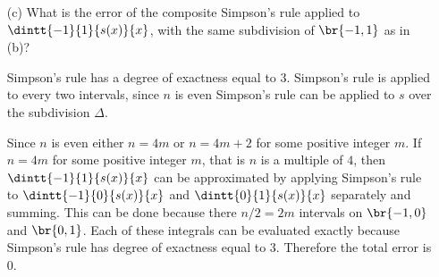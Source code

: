 \documentclass[11pt]{article}
\begin{document}
\begin{enumerate}
\begin{enumerate}
            \item[(c)] %
                What is the error of the composite Simpson's rule applied to
                $\dintt{-1}{1}{s(x)}{x}$, with the same subdivision of
                $\br{-1, 1}$ as in (b)?

                Simpson's rule has a degree of exactness equal to 3.
                Simpson's rule is applied to every two intervals, since $n$ is
                even Simpson's rule can be applied to $s$ over the subdivision
                $\Delta$.

                Since $n$ is even either $n = 4m$ or $n = 4m + 2$ for some positive
                integer $m$.
                If $n = 4m$ for some positive integer $m$, that is $n$ is a multiple
                of $4$, then $\dintt{-1}{1}{s(x)}{x}$ can be approximated by
                applying Simpson's rule to $\dintt{-1}{0}{s(x)}{x}$ and 
                $\dintt{0}{1}{s(x)}{x}$ separately and summing.
                This can be done because there $n/2 = 2m$ intervals on $\br{-1, 0}$ and
                $\br{0,1}$.
                Each of these integrals can be evaluated exactly because Simpson's rule
                has degree of exactness equal to 3.
                Therefore the total error is 0.


\end{enumerate}
\end{enumerate}
\end{document}
